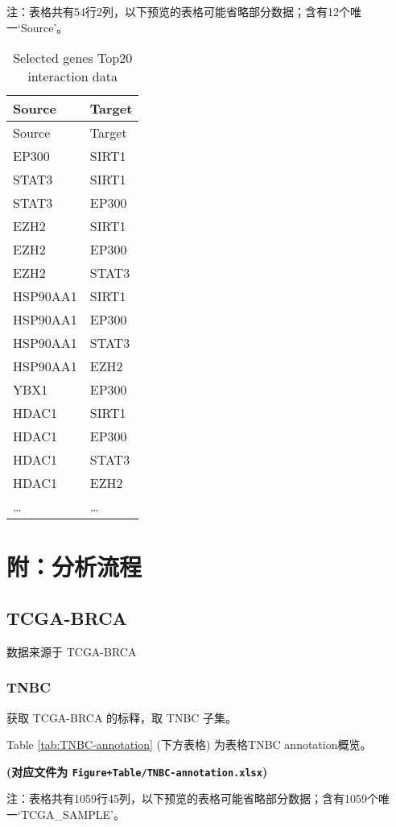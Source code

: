 \documentclass[
]{article}
\begin{document}
\begin{center}\begin{tcolorbox}[colback=gray!10, colframe=gray!50, width=0.9\linewidth, arc=1mm, boxrule=0.5pt]注：表格共有54行2列，以下预览的表格可能省略部分数据；含有12个唯一`Source'。
\end{tcolorbox}
\end{center}

\begin{longtable}[]{@{}ll@{}}
\caption{\label{tab:Selected-genes-Top20-interaction-data}Selected genes Top20 interaction data}\tabularnewline
\toprule
Source & Target\tabularnewline
\midrule
\endfirsthead
\toprule
Source & Target\tabularnewline
\midrule
\endhead
EP300 & SIRT1\tabularnewline
STAT3 & SIRT1\tabularnewline
STAT3 & EP300\tabularnewline
EZH2 & SIRT1\tabularnewline
EZH2 & EP300\tabularnewline
EZH2 & STAT3\tabularnewline
HSP90AA1 & SIRT1\tabularnewline
HSP90AA1 & EP300\tabularnewline
HSP90AA1 & STAT3\tabularnewline
HSP90AA1 & EZH2\tabularnewline
YBX1 & EP300\tabularnewline
HDAC1 & SIRT1\tabularnewline
HDAC1 & EP300\tabularnewline
HDAC1 & STAT3\tabularnewline
HDAC1 & EZH2\tabularnewline
\ldots{} & \ldots{}\tabularnewline
\bottomrule
\end{longtable}

\hypertarget{workflow2}{%
\section{附：分析流程}\label{workflow2}}

\hypertarget{tcga-brca}{%
\subsection{TCGA-BRCA}\label{tcga-brca}}

数据来源于 TCGA-BRCA

\hypertarget{tnbc}{%
\subsubsection{TNBC}\label{tnbc}}

获取 TCGA-BRCA 的标释，取 TNBC 子集。

Table \ref{tab:TNBC-annotation} (下方表格) 为表格TNBC annotation概览。

\textbf{(对应文件为 \texttt{Figure+Table/TNBC-annotation.xlsx})}

\begin{center}\begin{tcolorbox}[colback=gray!10, colframe=gray!50, width=0.9\linewidth, arc=1mm, boxrule=0.5pt]注：表格共有1059行45列，以下预览的表格可能省略部分数据；含有1059个唯一`TCGA\_SAMPLE'。
\end{tcolorbox}
\end{center}
\end{document}
